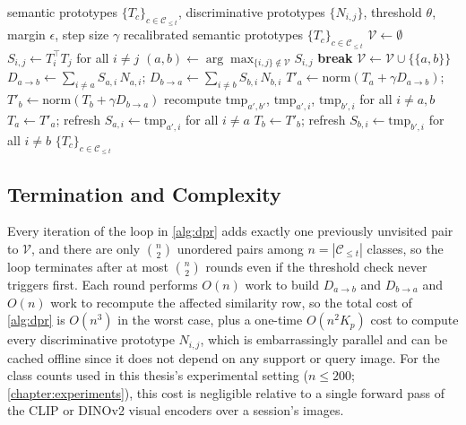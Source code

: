 \documentclass{iutbscthesis}
\begin{document}
\begin{algorithm}[H]
\caption{Discriminative Prompt-based Recalibration (DPR)}
\label{alg:dpr}
\begin{algorithmic}[1]
\Require semantic prototypes $\{T_c\}_{c \in \mathcal{C}_{\le t}}$, discriminative prototypes $\{N_{i,j}\}$, threshold $\theta$, margin $\epsilon$, step size $\gamma$
\Ensure recalibrated semantic prototypes $\{T_c\}_{c \in \mathcal{C}_{\le t}}$
\State $\mathcal{V} \gets \emptyset$
\State $S_{i,j} \gets T_i^\top T_j$ for all $i \ne j$
\Loop
    \State $(a,b) \gets \arg\max_{\{i,j\} \notin \mathcal{V}} S_{i,j}$
        \State \textbf{break}
    \EndIf
    \State $\mathcal{V} \gets \mathcal{V} \cup \{\{a,b\}\}$
    \State $D_{a \to b} \gets \sum_{i \ne a} S_{a,i}\, N_{a,i}$; \quad $D_{b \to a} \gets \sum_{i \ne b} S_{b,i}\, N_{b,i}$
    \State $T'_a \gets \mathrm{norm}(T_a + \gamma D_{a \to b})$; \quad $T'_b \gets \mathrm{norm}(T_b + \gamma D_{b \to a})$
    \State recompute $\mathrm{tmp}_{a',b'}$, $\mathrm{tmp}_{a',i}$, $\mathrm{tmp}_{b',i}$ for all $i \ne a,b$
            \State $T_a \gets T'_a$; refresh $S_{a,i} \gets \mathrm{tmp}_{a',i}$ for all $i \ne a$
        \EndIf
            \State $T_b \gets T'_b$; refresh $S_{b,i} \gets \mathrm{tmp}_{b',i}$ for all $i \ne b$
        \EndIf
    \EndIf
\EndLoop
\State \Return $\{T_c\}_{c \in \mathcal{C}_{\le t}}$
\end{algorithmic}
\end{algorithm}

\subsection{Termination and Complexity}

Every iteration of the loop in \autoref{alg:dpr} adds exactly one previously unvisited pair to $\mathcal{V}$, and there are only $\binom{n}{2}$ unordered pairs among $n = |\mathcal{C}_{\le t}|$ classes, so the loop terminates after at most $\binom{n}{2}$ rounds even if the threshold check never triggers first. Each round performs $O(n)$ work to build $D_{a \to b}$ and $D_{b \to a}$ and $O(n)$ work to recompute the affected similarity row, so the total cost of \autoref{alg:dpr} is $O(n^3)$ in the worst case, plus a one-time $O(n^2 K_p)$ cost to compute every discriminative prototype $N_{i,j}$, which is embarrassingly parallel and can be cached offline since it does not depend on any support or query image. For the class counts used in this thesis's experimental setting ($n \le 200$; \autoref{chapter:experiments}), this cost is negligible relative to a single forward pass of the CLIP or DINOv2 visual encoders over a session's images.
\end{document}
